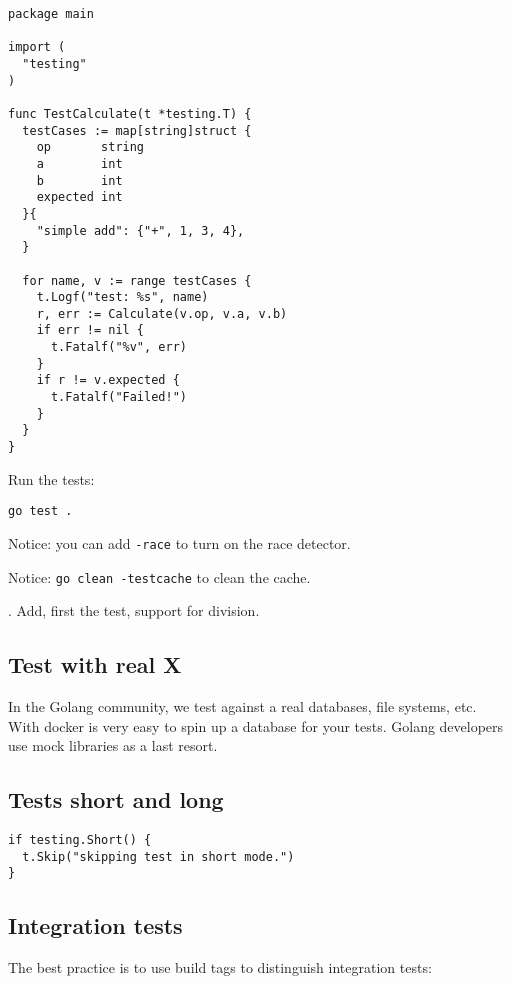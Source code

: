 \documentclass[11pt, letterpaper]{article}
\begin{document}
\begin{verbatim}
package main

import (
  "testing"
)

func TestCalculate(t *testing.T) {
  testCases := map[string]struct {
    op       string
    a        int
    b        int
    expected int
  }{
    "simple add": {"+", 1, 3, 4},
  }

  for name, v := range testCases {
    t.Logf("test: %s", name)
    r, err := Calculate(v.op, v.a, v.b)
    if err != nil {
      t.Fatalf("%v", err)
    }
    if r != v.expected {
      t.Fatalf("Failed!")
    }
  }
}
\end{verbatim}

Run the tests:

\begin{verbatim}
go test .
\end{verbatim}

Notice: you can add \verb|-race| to turn on the race detector.

Notice: \verb|go clean -testcache| to clean the cache.

. Add, first the test, support for division.

\subsection{Test with real X}

In the Golang community, we test against a real databases, file systems, etc. With docker is very easy to spin up a database for your tests. Golang developers use mock libraries as a last resort.

\subsection{Tests short and long}

\begin{verbatim}
if testing.Short() {
  t.Skip("skipping test in short mode.")
}
\end{verbatim}

\subsection{Integration tests}

The best practice is to use build tags to distinguish integration tests:
\end{document}
